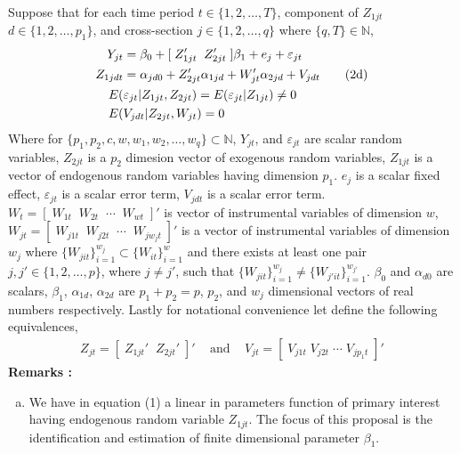 \documentclass[10pt]{article}
\begin{document}
\noindent Suppose that for each time period $t \in \{1,2, \ldots, T\}$, component of $Z_{1jt}$ $ d\in \{1,2, \ldots , p_1\}$, and cross-section $j \in \{1,2,\ldots, q\}$ where $\{q,T\} \in \mathbb{N}$,
\begin{align}
Y_{jt} &= \beta_0 + [\; Z_{1jt}' \;\; Z_{2jt}' \;] \beta_1 + e_j + \varepsilon_{jt} \\
%
Z_{1jdt} &= \alpha_{jd0} + Z_{2jt}' \alpha_{1jd} + W_{jt}' \alpha_{2jd} + V_{jdt} \tag{2d} \\
%
\addtocounter {equation} {1}
E(&\varepsilon_{jt} | Z_{1jt} , Z_{2jt}) = E(\varepsilon_{jt} | Z_{1jt}) \neq 0  \\
%
E(& V_{jdt} | Z_{2jt},W_{jt}) = 0
%
\end{align}
Where for $\{p_1,p_2,c,w,w_1,w_2, \ldots ,w_q \} \subset \mathbb{N}$, $Y_{jt}$, and $\varepsilon_{jt}$ are scalar random variables, $ Z_{2jt}$ is a $p_2$ dimesion vector of exogenous random variables, $Z_{1jt}$  is a vector of endogenous random variables having dimension $p_1$. $e_j$ is a scalar fixed effect, $\varepsilon_{jt}$ is a scalar error term, $V_{jdt}$ is a scalar error term. $W_t = [ \; W_{1t} \;\; W_{2t} \;\; \cdots \;\; W_{wt} \;]'$ is vector of instrumental variables of dimension $w$, $W_{jt} = [\;W_{j1t} \;\; W_{j2t} \;\; \cdots \;\; W_{jw_jt} \;]'$ is a vector of instrumental variables of dimension $w_j$ where $\{W_{jit}\}_{i=1}^{w_j} \subset \{W_{it}\}_{i=1}^{w}$ and there exists at least one pair $j,j'  \in \{1,2, \ldots , p\}$, where $j \neq j'$, such that $\{W_{jit}\}_{i=1}^{w_j} \neq \{W_{j'it}\}_{i=1}^{w_{j'}}$. $\beta_0$ and $\alpha_{d0}$  are scalars, $\beta_1$, $\alpha_{1d}$, $\alpha_{2d}$ are $p_1 +p_2 = p$, $p_2$, and $w_j$ dimensional vectors of real numbers respectively. Lastly for notational convenience let define the following equivalences,
\begin{align*}
Z_{jt} = [\; Z_{1jt}' \;\; Z_{2jt}' \;]'  \;\;\; \text{ and } \;\;\; V_{jt} = [ \; V_{j1t} \; V_{j2t} \; \cdots \;V_{jp_1t}\;]'
\end{align*}
%
\noindent \bf Remarks \rm:
\begin{enumerate}[a.)]
 \item We have in equation (1) a linear in parameters function of primary interest having endogenous random variable $Z_{1jt}$. The focus of this proposal is the identification and estimation of finite dimensional parameter $\beta_1$.

\end{enumerate}
\end{document}
